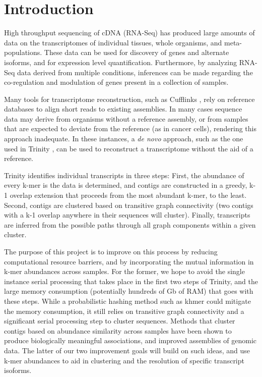 \documentclass[11pt]{article}
\begin{document}
\author{\myname\\\mylogin}
\date{\duedate}
\title{\thishwlong}
\maketitle


\section{Introduction}
High throughput sequencing of cDNA (RNA-Seq) has produced large amounts of data on the transcriptomes of individual tissues, whole organisms, and meta-populations. These data can be used for discovery of genes and alternate isoforms, and for expression level quantification. Furthermore, by analyzing RNA-Seq data derived from multiple conditions, inferences can be made regarding the co-regulation and modulation of genes present in a collection of samples.

Many tools for transcriptome reconstruction, such as Cufflinks \cite{trapnell10}, rely on reference databases to align short reads to existing assemblies. In many cases sequence data may derive from organisms without a reference assembly, or from samples that are expected to deviate from the reference (as in cancer cells), rendering this approach inadequate. In these instances, a {\sl de novo} approach, such as the one used in Trinity \cite{grabherr11}, can be used to reconstruct a transcriptome without the aid of a reference.

Trinity identifies individual transcripts in three steps: First, the abundance of every k-mer is the data is determined, and contigs are constructed in a greedy, k-1 overlap extension that proceeds from the most abundant k-mer, to the least. Second, contigs are clustered based on transitive graph connectivity (two contigs with a k-1 overlap anywhere in their sequences will cluster). Finally, transcripts are inferred from the possible paths through all graph components within a given cluster.

The purpose of this project is to improve on this process by reducing computational resource barriers, and by incorporating the mutual information in k-mer abundances across samples. For the former, we hope to avoid the single instance serial processing that takes place in the first two steps of Trinity, and the large memory consumption (potentially hundreds of Gb of RAM) that goes with these steps. While a probabilistic hashing method such as khmer \cite{pell12} could mitigate the memory consumption, it still relies on transitive graph connectivity and a significant serial processing step to cluster sequences. Methods that cluster contigs based on abundance similarity across samples \cite{sharon13} have been shown to produce biologically meaningful associations, and improved assemblies of genomic data. The latter of our two improvement goals will build on such ideas, and use k-mer abundances to aid in clustering and the resolution of specific transcript isoforms.
\end{document}
